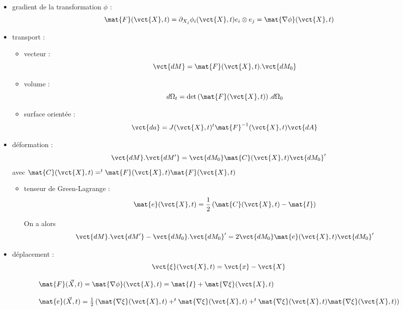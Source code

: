 \documentclass[11pt,a4paper]{article}
\begin{document}
\begin{itemize}
	\item gradient de la transformation $\phi$ :
	\begin{equation}
	\mat{F}(\vct{X},t)=\partial_{X_j}\phi_i(\vct{X},t)e_i\otimes e_j=\mat{\nabla\phi}(\vct{X},t)
	\end{equation}
	
	\item transport :
	\begin{itemize}
		\item vecteur : \[\vct{dM}=\mat{F}(\vct{X},t).\vct{dM_0}\]
		\item volume : \[d\Omega_t=\textrm{det}\left(\mat{F}(\vct{X},t)\right).d\Omega_0\]
		\item surface orientée : \[\vct{da}=J(\vct{X},t)^t\mat{F}^{-1}(\vct{X},t)\vct{dA}\]
	\end{itemize}
	
	\item déformation : \[\vct{dM}.\vct{dM'}=\vct{dM_0}\mat{C}(\vct{X},t)\vct{dM_0}'\] avec $\mat{C}(\vct{X},t)=^t\mat{F}(\vct{X},t)\mat{F}(\vct{X},t)$
	\begin{itemize}
		\item tenseur de Green-Lagrange : \[\mat{e}(\vct{X},t)=\frac{1}{2}\left(\mat{C}(\vct{X},t)-\mat{I}\right)\]
		
		\vspace{0cm}
		
		On a alors \[\vct{dM}.\vct{dM'}-\vct{dM_0}.\vct{dM_0}'=2\vct{dM_0}\mat{e}(\vct{X},t)\vct{dM_0}'\]
	\end{itemize}
	
	\item déplacement : \[\vct{\xi}(\vct{X},t)=\vct{x}-\vct{X}\]
	
	\begin{equation*}
	\begin{array}{l}
	\mat{F}(\vec{X},t)=\mat{\nabla\phi}(\vct{X},t)=\mat{I}+\mat{\nabla\xi}(\vct{X},t) \\
	\\
	\mat{e}(\vec{X},t)=\frac{1}{2}\left(\mat{\nabla\xi}(\vct{X},t)+^t\mat{\nabla\xi}(\vct{X},t) +^t\mat{\nabla\xi}(\vct{X},t)\mat{\nabla\xi}(\vct{X},t)\right)
	\end{array}
	\end{equation*}
\end{itemize}
\end{document}
